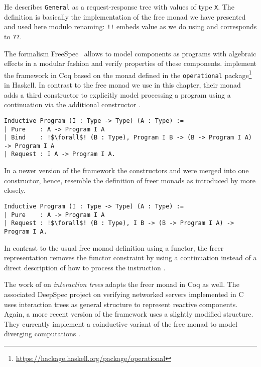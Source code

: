 He describes \texttt{General} as a request\--response tree with values of type \texttt{X}.
The definition is basically the implementation of the free monad we have presented and used here modulo renaming: \texttt{!!} embeds value as we do using  and  corresponds to \texttt{??}.

The formalism FreeSpec~\citep{letan2018modular} allows to model components as programs with algebraic effects in a modular fashion and verify properties of these components.
\citeauthor{letan2018modular} implement the framework in Coq based on the  monad defined in the \texttt{operational} package\footnote{\url{https://hackage.haskell.org/package/operational}} in Haskell.
In contrast to the free monad we use in this chapter, their  monad adds a third constructor to explicitly model processing a program using a continuation via the additional constructor .

\begin{verbatim}
Inductive Program (I : Type -> Type) (A : Type) :=
| Pure    : A -> Program I A
| Bind    : !$\forall$! (B : Type), Program I B -> (B -> Program I A) -> Program I A
| Request : I A -> Program I A.
\end{verbatim}

In a newer version of the framework the constructors  and  were merged into one constructor, hence, resemble the definition of freer monads as introduced by \citet{kiselyov2015freer} more closely.

\begin{verbatim}
Inductive Program (I : Type -> Type) (A : Type) :=
| Pure    : A -> Program I A
| Request : !$\forall$! (B : Type), I B -> (B -> Program I A) -> Program I A.
\end{verbatim}

In contrast to the usual free monad definition using a functor, the freer representation removes the functor constraint by using a continuation  instead of a direct description of how to process the instruction .

The work of \citet{koh2019interaction} on \emph{interaction trees} adapts the freer monad in Coq as well.
The associated DeepSpec project on verifying networked servers implemented in C uses interaction trees as general structure to represent reactive components.
Again,  a more recent version of the framework uses a slightly modified structure.
They currently implement a coinductive variant of the free monad to model diverging computations \citep{xia2019interaction}.

